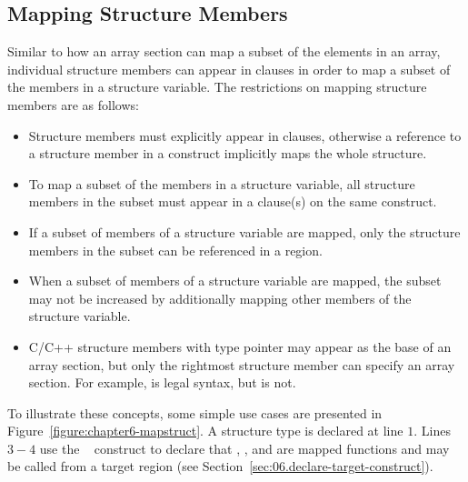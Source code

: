 \subsection{Mapping Structure Members}
\label{ssec:06.map-structs}

Similar to how an array section can map a subset of the elements in an array,
individual structure members can appear in  clauses in order to map
a subset of the members in a structure variable.  The restrictions on mapping
structure members are as follows:

\begin{itemize}

 \item Structure members must explicitly appear in  clauses,
 otherwise a reference to a structure member in a  construct
 implicitly maps the whole structure.

 \item To map a subset of the members in a structure variable, 
 all structure members in the subset must appear in a  clause(s) on the same
 construct.

 \item If a subset of members of a structure variable are mapped, only the
 structure members in the subset can be referenced in a  region.

 \item When a subset of members of a structure variable are mapped, the
 subset may not be increased by additionally mapping other members of the
 structure variable.

 \item C/C++ structure members with type pointer may appear as the base of an
 array section, but only the rightmost structure member can specify an array
 section.  For example,  is legal syntax, but  is not.

\end{itemize}

To illustrate these concepts, some simple use cases are presented in
Figure~\ref{figure:chapter6-mapstruct}.  A structure type  is declared
at line $1$. Lines $3-4$ use the ~ construct to declare that
, , and  are mapped functions and may be called from a target region 
(see Section~\ref{sec:06.declare-target-construct}).

